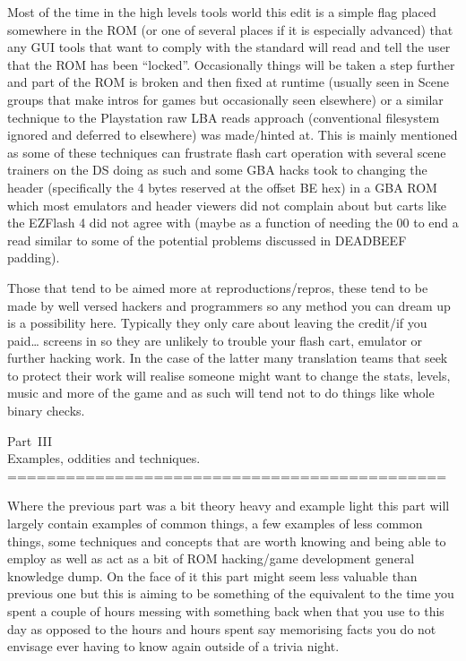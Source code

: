 \documentclass[
]{book}
\begin{document}
Most of the time in the high levels tools world this edit is a simple flag placed somewhere in the ROM (or one of several places if it is especially advanced) that any GUI tools that want to comply with the standard will read and tell the user that the ROM has been ``locked''. Occasionally things will be taken a step further and part of the ROM is broken and then fixed at runtime (usually seen in Scene groups that make intros for games but occasionally seen elsewhere) or a similar technique to the Playstation raw LBA reads approach (conventional filesystem ignored and deferred to elsewhere) was made/hinted at. This is mainly mentioned as some of these techniques can frustrate flash cart operation with several scene trainers on the DS doing as such and some GBA hacks took to changing the header (specifically the 4 bytes reserved at the offset BE hex) in a GBA ROM which most emulators and header viewers did not complain about but carts like the EZFlash 4 did not agree with (maybe as a function of needing the 00 to end a read similar to some of the potential problems discussed in DEADBEEF padding).

Those that tend to be aimed more at reproductions/repros, these tend to be made by well versed hackers and programmers so any method you can dream up is a possibility here. Typically they only care about leaving the credit/if you paid\ldots{} screens in so they are unlikely to trouble your flash cart, emulator or further hacking work. In the case of the latter many translation teams that seek to protect their work will realise someone might want to change the stats, levels, music and more of the game and as such will tend not to do things like whole binary checks.

Part~III\\
Examples, oddities and techniques.
=============================================

Where the previous part was a bit theory heavy and example light this part will largely contain examples of common things, a few examples of less common things, some techniques and concepts that are worth knowing and being able to employ as well as act as a bit of ROM hacking/game development general knowledge dump. On the face of it this part might seem less valuable than previous one but this is aiming to be something of the equivalent to the time you spent a couple of hours messing with something back when that you use to this day as opposed to the hours and hours spent say memorising facts you do not envisage ever having to know again outside of a trivia night.
\end{document}
